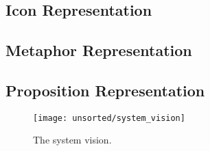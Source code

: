 

\subsection{Icon Representation}


\subsection{Metaphor Representation}


\subsection{Proposition Representation}


\begin{figure}[!htbp]
    \centering
    \texttt{[image: unsorted/system\_vision]}
    \caption{The system vision.}
    \label{fig:system_vision}
\end{figure}
\FloatBarrier
